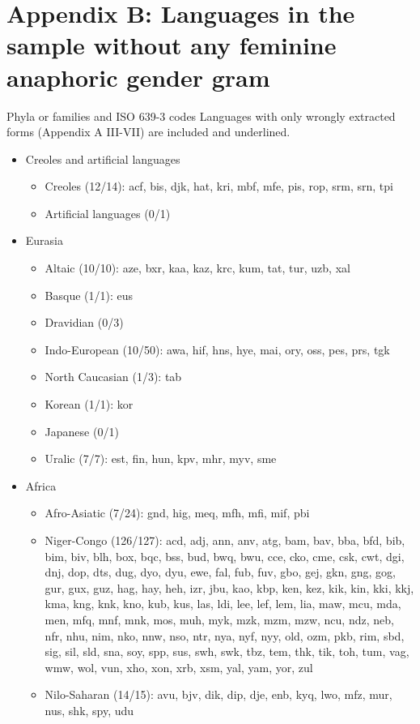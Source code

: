 
\section*{Appendix B: Languages in the sample without any feminine anaphoric gender gram \normalfont [629 languages]}

\noindent Phyla or families and ISO 639-3 codes
\noindent Languages with only wrongly extracted forms (Appendix A III-VII) are included and underlined.

\begin{itemize}[label={},leftmargin=!,labelindent=5pt,itemindent=-15pt]
  \item Creoles and artificial languages
    \begin{itemize}[label={},leftmargin=!,labelindent=5pt,itemindent=-15pt]
  	\item Creoles (12/14): acf, bis, djk, hat, kri, mbf, mfe, pis, rop, srm, srn, tpi
  	\item Artificial languages (0/1)
  \end{itemize}

  \item Eurasia
    \begin{itemize}[label={},leftmargin=!,labelindent=5pt,itemindent=-15pt]
  	\item Altaic (10/10): aze, bxr, kaa, kaz, krc, kum, tat, tur, uzb, xal
  	\item Basque (1/1): eus
  	\item Dravidian (0/3)
  	\item Indo-European (10/50): awa, hif, hns, hye, mai, ory, oss, pes, prs, tgk
  	\item North Caucasian (1/3): tab
  	\item Korean (1/1): kor
  	\item Japanese (0/1)
  	\item Uralic (7/7): est, fin, hun, kpv, mhr, myv, sme
  \end{itemize}

  \item Africa
    \begin{itemize}[label={},leftmargin=!,labelindent=5pt,itemindent=-15pt]
  	\item Afro-Asiatic (7/24): gnd, hig, meq, mfh, mfi, mif, pbi
  	\item Niger-Congo (126/127): acd, adj, ann, anv, atg, bam, bav, bba, bfd, bib, bim, biv, blh, box, bqc, bss, bud, bwq, bwu, cce, cko, cme, csk, cwt, dgi, dnj, dop, dts, dug, dyo, dyu, ewe, fal, fub, fuv, gbo, gej, gkn, gng, gog, gur, gux, guz, hag, hay, heh, izr, jbu, kao, kbp, ken, kez, kik, kin, kki, kkj, kma, kng, knk, kno, kub, kus, las, ldi, lee, lef, lem, lia, maw, mcu, mda, men, mfq, mnf, mnk, mos, muh, myk, mzk, mzm, mzw, ncu, ndz, neb, nfr, nhu, nim, nko, nnw, nso, ntr, nya, nyf, nyy, old, ozm, pkb, rim, sbd, sig, sil, sld, sna, soy, spp, sus, swh, swk, tbz, tem, thk, tik, toh, tum, vag, wmw, wol, vun, xho, xon, xrb, xsm, yal, yam, yor, zul
  	\item Nilo-Saharan (14/15): avu, bjv, dik, dip, dje, enb, kyq, lwo, mfz, mur, nus, shk, spy, udu
    \end{itemize}


\end{itemize}
